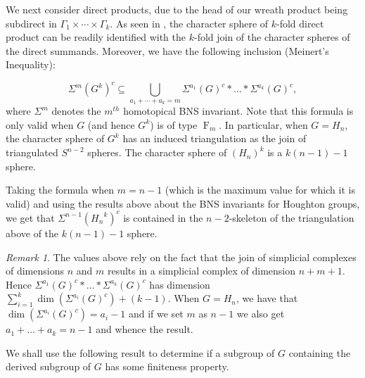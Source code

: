 \documentclass[11pt,a4paper]{amsart}
\theoremstyle{definition}
\theoremstyle{remark}
\newtheorem{remark}[theorem]{Remark}
\newcommand{\FFF}{\operatorname{F}}
\begin{document}
We next consider direct products, due to the head of our wreath product being subdirect in $\Gamma_1\times\cdots\times\Gamma_k$. As seen in \cite{BNSdirectprods}, the character sphere of $k$-fold direct product can be readily identified with the $k$-fold join of the character spheres of the direct summands. Moreover, we have the following inclusion (Meinert's Inequality):

$$
\Sigma^m(G^k)^c \subseteq \bigcup_{a_1+\cdots+a_k=m} \Sigma^{a_1}(G)^c* \ldots * \Sigma^{a_k}(G)^c,
$$ 
where $\Sigma^m$ denotes the $m^{th}$ homotopical BNS invariant. Note that this formula is only valid when $G$ (and hence $G^k$) is of type $\FFF_m$. In particular, when $G=H_n$, the character sphere of $G^k$ has an induced triangulation as the join of triangulated $S^{n-2}$ spheres. The character sphere of $(H_n)^k$ is a $k(n-1) -1$ sphere. 

Taking the formula when $m=n-1$ (which is the maximum value for which it is valid) and using the results above about the BNS invariants for Houghton groups, we get that $\Sigma^{n-1}({H_n}^k)^c$ is contained in the $n-2$-skeleton of the triangulation above of the  $k(n-1) -1$ sphere.

\begin{remark} The values above rely on the fact that the join of simplicial complexes of dimensions $n$ and $m$ results in a simplicial complex of dimension $n+m+1$. Hence $ \Sigma^{a_1}(G)^c* \ldots * \Sigma^{a_k}(G)^c$ has dimension $\sum_{i=1}^k \dim(\Sigma^{a_i}(G)^c) + (k-1)$. When $G=H_n$, we have that $\dim(\Sigma^{a_i}(G)^c) = a_i-1$ and if we set $m$ as $n-1$ we also get $a_1+\ldots +a_k = n-1$ and whence the result.
\end{remark}

We shall use the following result to determine if a subgroup of $G$ containing the derived subgroup of $G$ has some finiteness property.
\end{document}
